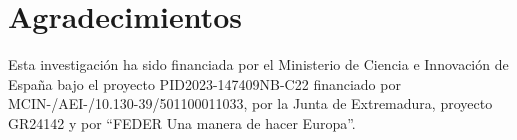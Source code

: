 \chapter*{Agradecimientos}
\begin{center}
    \thispagestyle{empty}
    \vspace*{\fill}
    Esta investigación ha sido financiada por el Ministerio de Ciencia e Innovación de España bajo el proyecto PID2023-147409NB-C22 financiado por MCIN-/AEI-/10.130-39/501100011033, por la Junta de Extremadura, proyecto GR24142 y por “FEDER Una manera de hacer Europa”.
    \vspace*{\fill}
\end{center}